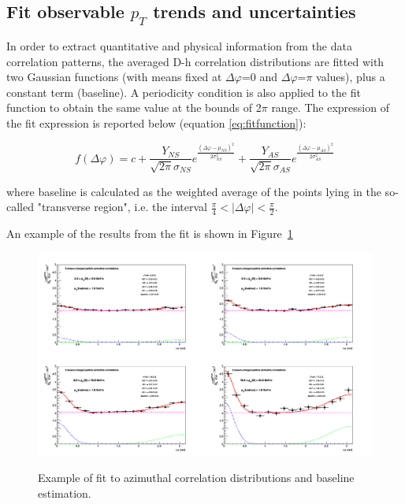 \subsection{Fit observable $p_{T}$ trends and uncertainties}


In order to extract quantitative and physical information from the data correlation patterns, the averaged D-h correlation distributions are fitted with two Gaussian functions (with means fixed at $\Delta\varphi$=0 and $\Delta\varphi$=$\pi$ values), plus a constant term (baseline). A periodicity condition is also applied to the fit function to obtain the same value at the bounds of 2$\pi$ range. The expression of the fit expression is reported below (equation \ref{eq:fitfunction}):

\begin{equation}
f\left(\Delta\varphi\right) = c + \frac{Y_{NS}}{\sqrt{2\pi}\sigma_{NS}}e^{\frac{\left(\Delta\varphi-\mu_{NS}\right)^{2}}{2\sigma_{NS}^{2}}} + \frac{Y_{AS}}{\sqrt{2\pi}\sigma_{AS}}e^{\frac{\left(\Delta\varphi-\mu_{AS}\right)^{2}}{2\sigma_{AS}^{2}}}
\label{eq:fitfunction}
\end{equation}

where baseline is calculated as the weighted average of the points lying in the so-called "transverse region", i.e. the interval $\frac{\pi}{4}<|\Delta\varphi|<\frac{\pi}{2}$.

An example of the results from the fit is shown in Figure~\ref{fig:ExFit}

\begin{figure}[h]
\centering
{\includegraphics[width=0.99\linewidth, height=0.70\linewidth]{figures/FitOutput/cFitting_0_pthad1dotto99dot.png}}
\caption{Example of fit to azimuthal correlation distributions and baseline estimation.}
 \label{fig:ExFit}
 \end{figure}

